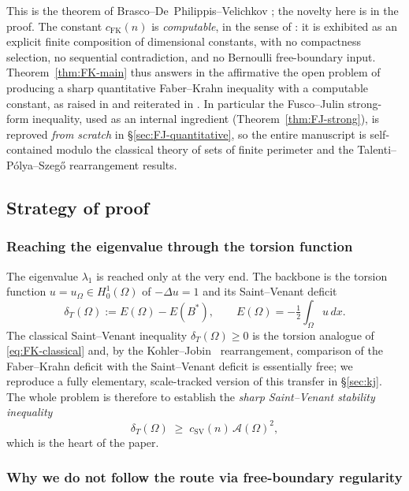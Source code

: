 \documentclass[11pt]{amsart}
\theoremstyle{definition}
\newcommand{\Om}{\Omega}
\newcommand{\Fr}{\mathcal A}
\newcommand{\dT}{\delta_T}
\newcommand{\Bstar}{B^*}
\begin{document}
This is the theorem of Brasco--De~Philippis--Velichkov \cite{BDV}; the
novelty here is in the proof.  The constant \(c_{\mathrm{FK}}(n)\) is
\emph{computable}, in the sense of \cite[Open~Problem~2]{BraDeP2017}: it
is exhibited as an explicit finite composition of dimensional constants,
with no compactness selection, no sequential contradiction, and no
Bernoulli free-boundary input.  Theorem~\ref{thm:FK-main} thus answers
in the affirmative the open problem of producing a sharp quantitative
Faber--Krahn inequality with a computable constant, as raised in
\cite[p.~22]{BraDeP2017} and reiterated in
\cite[\S1]{Allen2021}.  In particular the Fusco--Julin
strong-form inequality, used as an internal ingredient
(Theorem~\ref{thm:FJ-strong}), is reproved \emph{from scratch} in
\S\ref{sec:FJ-quantitative}, so the entire manuscript is self-contained
modulo the classical theory of sets of finite perimeter
\cite{AFP2000,Maggi2012} and the Talenti--P\'olya--Szeg\H{o} rearrangement
results.

\subsection{Strategy of proof}\label{sec:intro-strategy}

\subsubsection*{Reaching the eigenvalue through the torsion function}

The eigenvalue \(\lambda_1\) is reached only at the very end.  The
backbone is the torsion function
\(u=u_\Om\in H^1_0(\Om)\) of \(-\Delta u=1\) and its Saint--Venant deficit
\[
   \dT(\Om):=E(\Om)-E(\Bstar),
   \qquad E(\Om)=-\tfrac12\int_\Om u\,dx .
\]
The classical Saint--Venant inequality \(\dT(\Om)\ge0\) is the torsion
analogue of \eqref{eq:FK-classical} and, by the
Kohler--Jobin~\cite{KJ1,KJ2,KJ3,Brasco2014} rearrangement, comparison of
the Faber--Krahn deficit with the Saint--Venant deficit is essentially
free; we reproduce a fully elementary, scale-tracked version of this
transfer in \S\ref{sec:kj}.  The whole problem is therefore to establish
the \emph{sharp Saint--Venant stability inequality}
\begin{equation}\label{eq:sharpSV}
   \dT(\Om)\;\ge\; c_{\mathrm{SV}}(n)\,\Fr(\Om)^2,
\end{equation}
which is the heart of the paper.

\subsubsection*{Why we do not follow the route via free-boundary regularity}
\end{document}
